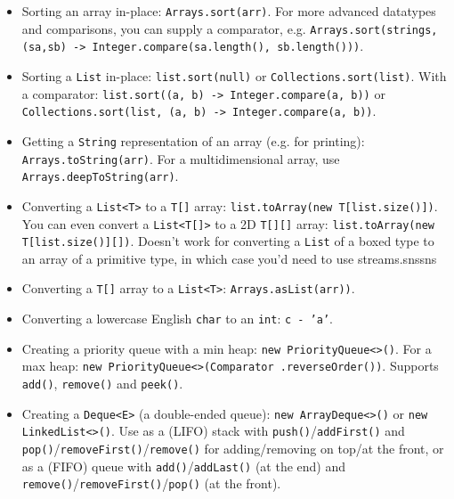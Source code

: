 \documentclass[table, xcdraw]{article}%
\begin{document}
\begin{itemize}
    \item Sorting an array in-place: \texttt{Arrays.sort(arr)}. For more advanced datatypes and comparisons, you can supply a comparator, e.g. \texttt{Arrays.sort(strings, (sa,sb) -> Integer.compare(sa.length(), sb.length()))}.
    \item Sorting a \texttt{List} in-place: \texttt{list.sort(null)} or \texttt{Collections.sort(list)}. With a comparator: \texttt{list.sort((a, b) -> Integer.compare(a, b))} or \texttt{Collections.sort(list, (a, b) -> Integer.compare(a, b))}.
    \item Getting a \texttt{String} representation of an array (e.g. for printing): \texttt{Arrays.toString(arr)}. For a multidimensional array, use \texttt{Arrays.deepToString(arr)}.
    \item Converting a \texttt{List<T>} to a \texttt{T[]} array: \texttt{list.toArray(new T[list.size()])}. You can even convert a \texttt{List<T[]>} to a 2D \texttt{T[][]} array: \texttt{list.toArray(new T[list.size()][])}. Doesn't work for converting a \texttt{List} of a boxed type to an array of a primitive type, in which case you'd need to use streams.snssns
    \item Converting a \texttt{T[]} array to a \texttt{List<T>}: \texttt{Arrays.asList(arr))}.
    \item Converting a lowercase English \texttt{char} to an \texttt{int}: \texttt{c - 'a'}.
    \item Creating a priority queue with a min heap: \texttt{new PriorityQueue<>()}. For a max heap: \texttt{new PriorityQueue<>(Comparator .reverseOrder())}. Supports \texttt{add()}, \texttt{remove()} and \texttt{peek()}.
    \item Creating a \texttt{Deque<E>} (a double-ended queue): \texttt{new ArrayDeque<>()} or \texttt{new LinkedList<>()}. Use as a (LIFO) stack with \texttt{push()}/\texttt{addFirst()} and \texttt{pop()}/\texttt{removeFirst()}/\texttt{remove()} for adding/removing on top/at the front, or as a (FIFO) queue with \texttt{add()}/\texttt{addLast()} (at the end) and \texttt{remove()}/\texttt{removeFirst()}/\texttt{pop()} (at the front).

\end{itemize}
\end{document}

